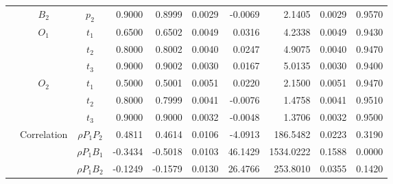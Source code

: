 \documentclass[letterpaper]{article}
\begin{document}
\begin{table}[h]
\begin{tabular}{cccrrrrrrr}
            & $B_2$       & $p_2$          & 0.9000                 & 0.8999                 & 0.0029                 & -0.0069                & 2.1405                 & 0.0029                   & 0.9570                 \\
            & $O_1$       & $t_1$          & 0.6500                 & 0.6502                 & 0.0049                 & 0.0316                 & 4.2338                 & 0.0049                   & 0.9430                 \\
            &             & $t_2$          & 0.8000                 & 0.8002                 & 0.0040                 & 0.0247                 & 4.9075                 & 0.0040                   & 0.9470                 \\
            &             & $t_3$          & 0.9000                 & 0.9002                 & 0.0030                 & 0.0167                 & 5.0135                 & 0.0030                   & 0.9400                 \\
            & $O_2$       & $t_1$          & 0.5000                 & 0.5001                 & 0.0051                 & 0.0220                 & 2.1500                 & 0.0051                   & 0.9470                 \\
            &             & $t_2$          & 0.8000                 & 0.7999                 & 0.0041                 & -0.0076                & 1.4758                 & 0.0041                   & 0.9510                 \\
            &             & $t_3$          & 0.9000                 & 0.9000                 & 0.0032                 & -0.0048                & 1.3706                 & 0.0032                   & 0.9500                 \\
            & Correlation & $\rho{P_1P_2}$ & 0.4811                 & 0.4614                 & 0.0106                 & -4.0913                & 186.5482               & 0.0223                   & 0.3190                 \\
            &             & $\rho{P_1B_1}$ & -0.3434                & -0.5018                & 0.0103                 & 46.1429                & 1534.0222              & 0.1588                   & 0.0000                 \\
            &             & $\rho{P_1B_2}$ & -0.1249                & -0.1579                & 0.0130                 & 26.4766                & 253.8010               & 0.0355                   & 0.1420                 \\

\end{tabular}
\end{table}
\end{document}
